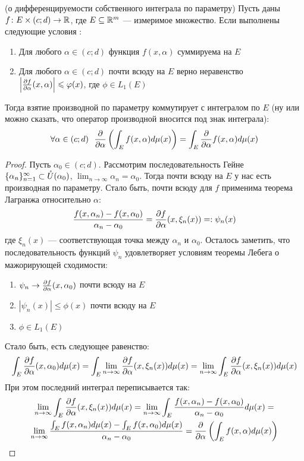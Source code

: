 \begin{theorem} (о дифференцируемости собственного интеграла по параметру)
	Пусть даны $f \colon E \times (c; d) \to \mathbb{R}$, где $E \subseteq \mathbb{R}^m$ --- измеримое множество. Если выполнены следующие условия :
	\begin{enumerate}
		\item Для любого $\alpha \in (c; d)$ функция $f(x, \alpha)$ суммируема на $E$
		
		\item Для любого $\alpha \in (c; d)$ почти всюду на $E$ верно неравенство $\left|\frac{\partial f}{\partial \alpha}(x, \alpha)\right| \leqslant \varphi(x)$, где $\phi \in L_1(E)$
	\end{enumerate}
	Тогда взятие производной по параметру коммутирует с интегралом по $E$ (ну или можно сказать, что оператор производной вносится под знак интеграла):
	\[
		\forall \alpha \in (c; d)\ \ \pd{}{\alpha} \ps{\int_E f(x, \alpha)d\mu(x)} = \int_E \pd{}{\alpha}f(x, \alpha)d\mu(x)
	\]
\end{theorem}

\begin{proof}
	Пусть $\alpha_0 \in (c; d)$. Рассмотрим последовательность Гейне $\{\alpha_n\}_{n = 1}^\infty \subset \mathring{U}(\alpha_0)$, $\lim_{n \to \infty} \alpha_n = \alpha_0$. Тогда почти всюду на $E$ у нас есть производная по параметру. Стало быть, почти всюду для $f$ применима теорема Лагранжа относительно $\alpha$:
	\[
		\frac{f(x, \alpha_n) - f(x, \alpha_0)}{\alpha_n - \alpha_0} = \frac{\partial f}{\partial \alpha}(x, \xi_n(x)) =: \psi_n(x)
	\]
	где $\xi_n(x)$ --- соответствующая точка между $\alpha_n$ и $\alpha_0$. Осталось заметить, что последовательность функций $\psi_n$ удовлетворяет условиям теоремы Лебега о мажорирующей сходимости:
	\begin{enumerate}
		\item $\psi_n \to \frac{\partial f}{\partial \alpha}(x, \alpha_0)$ почти всюду на $E$
		
		\item $|\psi_n(x)| \le \phi(x)$ почти всюду на $E$
		
		\item $\phi \in L_1(E)$
	\end{enumerate}
	Стало быть, есть следующее равенство:
	\[
		\int_E \frac{\partial f}{\partial \alpha}(x, \alpha_0)d\mu(x) = \int_E \lim_{n \to \infty} \frac{\partial f}{\partial \alpha}(x, \xi_n(x))d\mu(x) = \lim_{n \to \infty} \int_E \frac{\partial f}{\partial \alpha}(x, \xi_n(x))d\mu(x)
	\]
	При этом последний интеграл переписывается так:
	\begin{multline*}
		\lim_{n \to \infty} \int_E \frac{\partial f}{\partial \alpha}(x, \xi_n(x))d\mu(x) = \lim_{n \to \infty} \int_E \frac{f(x, \alpha_n) - f(x, \alpha_0)}{\alpha_n - \alpha_0}d\mu(x) =
		\\
		\lim_{n \to \infty} \frac{\int_E f(x, \alpha_n)d\mu(x) - \int_E f(x, \alpha_0)d\mu(x)}{\alpha_n - \alpha_0} = \frac{\partial }{\partial \alpha} \left(\int_E f(x, \alpha)d\mu(x)\right)
	\end{multline*}
\end{proof}

